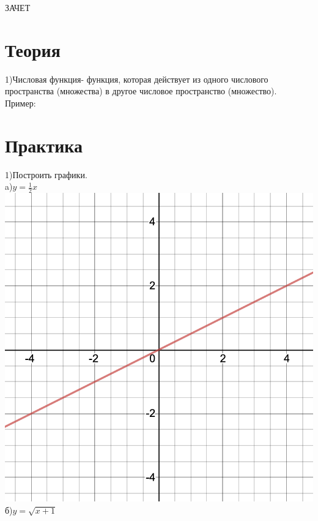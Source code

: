 \documentclass[a4paper]{article}
\begin{document}
    \begin{center} 
        \LARGE ЗАЧЕТ\\
    \end{center}
    \newpage
\section{Теория}
    1)Числовая функция- функция, которая действует из
    одного числового пространства (множества)
    в другое числовое пространство (множество).\\
    Пример:\\
    \newpage
    \section{Практика}
    1)Построить графики. \\
    a)$y=\frac{1}{2}x$
    \includegraphics[scale=0.1]{a}
    б)$y=\sqrt{x+1}$
\end{document}
